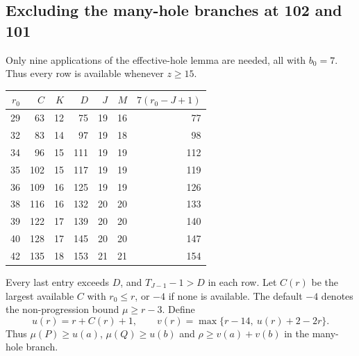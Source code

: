 \documentclass[11pt,a4paper]{article}
\theoremstyle{remark}
\begin{document}
\subsection{Excluding the many-hole branches at 102 and 101}
Only nine applications of the effective-hole lemma are needed, all with
$b_0=7$. Thus every row is available whenever $z\geq15$.
\begin{center}\small
\begin{tabular}{rrrrrrr}
\toprule
$r_0$&$C$&$K$&$D$&$J$&$M$&$7(r_0-J+1)$\\
\midrule
29&63&12&75&19&16&77\\
32&83&14&97&19&18&98\\
34&96&15&111&19&19&112\\
35&102&15&117&19&19&119\\
36&109&16&125&19&19&126\\
38&116&16&132&20&20&133\\
39&122&17&139&20&20&140\\
40&128&17&145&20&20&147\\
42&135&18&153&21&21&154\\
\bottomrule
\end{tabular}
\end{center}
Every last entry exceeds $D$, and $T_{J-1}-1>D$ in each row.
Let $C(r)$ be the largest available $C$ with $r_0\leq r$, or $-4$ if
none is available. The default $-4$ denotes the non-progression bound
$\mu\geq r-3$. Define
\[
 u(r)=r+C(r)+1,\qquad
 v(r)=\max\{r-14,\ u(r)+2-2r\}.
\]
Thus $\mu(P)\geq u(a)$, $\mu(Q)\geq u(b)$ and
$\rho\geq v(a)+v(b)$ in the many-hole branch.
\end{document}
